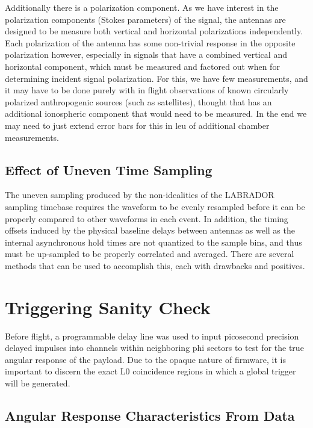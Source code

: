 		Additionally there is a polarization component.  As we have interest in the polarization components (Stokes parameters) of the signal, the antennas are designed to be measure both vertical and horizontal polarizations independently.  Each polarization of the antenna has some non-trivial response in the opposite polarization however, especially in signals that have a combined vertical and horizontal component, which must be measured and factored out when for determining incident signal polarization.  For this, we have few measurements, and it may have to be done purely with in flight observations of known circularly polarized anthropogenic sources (such as satellites), thought that has an additional ionospheric component that would need to be measured.  In the end we may need to just extend error bars for this in leu of additional chamber measurements.
	\subsection{Effect of Uneven Time Sampling}
	The uneven sampling produced by the non-idealities of the LABRADOR sampling timebase requires the waveform to be evenly resampled before it can be properly compared to other waveforms in each event.  In addition, the timing offsets induced by the physical baseline delays between antennas as well as the internal asynchronous hold times are not quantized to the sample bins, and thus must be up-sampled to be properly correlated and averaged.  There are several methods that can be used to accomplish this, each with drawbacks and positives.

	
	
\section{Triggering Sanity Check}
		Before flight, a programmable delay line was used to input picosecond precision delayed impulses into channels within neighboring phi sectors to test for the true angular response of the payload.  Due to the opaque nature of firmware, it is important to discern the exact L0 coincidence regions in which a global trigger will be generated.
	\subsection{Angular Response Characteristics From Data}


